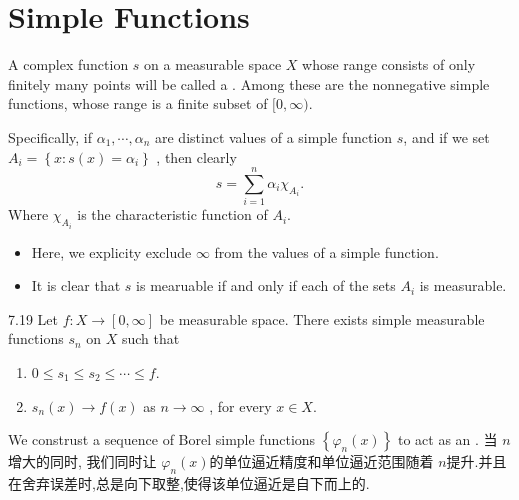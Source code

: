 \documentclass[../main.tex]{subfiles}
\begin{document}
\section{Simple Functions}

\begin{definition}{}{}
    A complex function \(  s  \) on a measurable space \(  X  \) whose range consists of only finitely many points will be called a . Among these are the nonnegative simple functions, whose range is a finite subset of \(  [0,\infty)  \).    

   Specifically, if \(   \alpha_1,\cdots,\alpha_n   \) are distinct values of a simple function \(  s  \), and if we set \(  A_{i}= \left\{ x:s\left( x \right)= \alpha _{i}  \right\}  \) , then clearly \[
    s= \sum _{i= 1}^{n}\alpha _{i}\chi _{A_{i}}.
    \]Where \(  \chi _{A_{i}}  \) is the characteristic function of \(  A_{i}  \).      
\end{definition}
\begin{remark}
  \begin{itemize}
    \item   Here, we explicity exclude \(  \infty  \) from the values of a simple function. 
    \item It is clear that \(  s  \) is mearuable if and only if each of the sets \(  A_{i}  \) is measurable.  
  \end{itemize}
  
\end{remark}

\begin{theorem}{}{7.19}
    Let \(  f: X\to [0,\infty]  \) be measurable space. There exists simple measurable functions \(  s_{n}  \) on \(  X  \) such that 
    \begin{enumerate}
        \item \(  0\le s_1\le s_2\le \cdots \le f  \). 
        \item \(  s_{n}\left( x \right)\to f\left( x \right)    \) as \(  n\to \infty  \) , for every \(  x \in X  \).     
    \end{enumerate}
       
\end{theorem}

\begin{proofsketch}
    We construst a sequence of Borel  simple functions \( \left\{  \varphi _{n}\left( x \right) \right\}    \) to act as an . 当 \(  n  \) 增大的同时, 我们同时让 \(   \varphi _{n}\left( x \right)   \)的单位逼近精度和单位逼近范围随着 \(  n  \)提升.并且在舍弃误差时,总是向下取整,使得该单位逼近是自下而上的.   
\end{proofsketch}
\end{document}
